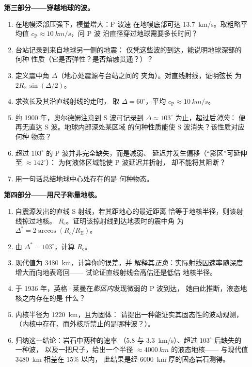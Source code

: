 \begin{problem}
\medskip\noindent\textbf{第三部分——穿越地球的波。}
\begin{enumerate}[resume]
  \item 在地幔深部压强下，模量增大：P 波速
        在地幔底部可达 \qty{13.7}{km/s}。取粗略平均值
        $c_{\text{P}} \approx \qty{10}{km/s}$，问 P 波
        沿直径穿过地球需要多长时间？
  \item 台站记录到来自地球另一侧的地震：
        仅凭这些波的到达，能说明地球深部的何种
        性质（它是否弹性？是否熔融贯通？）？
  \item 定义震中角 $\Delta$（地心处震源与台站之间的
        夹角）。对直线射线，证明弦长
        为 $2R_{\text{E}}\sin(\Delta/2)$。
  \item 求弦长及其沿直线射线的走时，
        取 $\Delta = 60^\circ$，平均 $c_{\text{P}} \approx
        \qty{10}{km/s}$。
  \item 约 1900 年，奥尔德姆注意到 S 波可记录到
        $\Delta \approx 103^\circ$ 为止，超过后\emph{消失}：
        便再无直达 S 波。地球内部深处某区域
        的何种性质能使 S 波消失？该性质对应何种
        物态？
  \item 超过 $103^\circ$ 的 P 波并非完全缺失，而是减弱、
        延迟并发生偏移（“影区”可延伸至 $\approx 142^\circ$）：
        为何液体区域能使 P 波延迟并折射，
        却不能将其阻断？
  \item 用一句话总结地球中心处存在的是
        何种物态。
\end{enumerate}

\medskip\noindent\textbf{第四部分——用尺子称量地核。}
\begin{enumerate}[resume]
  \item 自震源发出的直线 S 射线，若其距地心的最近距离
        恰等于地核半径，则该射线掠过地核。
        $R_{\text{c}}$。证明该掠射线到达地表时的震中角
        为 $\Delta^* =
        2\arccos(R_{\text{c}}/R_{\text{E}})$。
  \item 由 $\Delta^* = 103^\circ$，计算 $R_{\text{c}}$。
  \item 现代值为 \qty{3480}{km}，计算你的误差，并
        解释其\emph{正负}：实际射线因速率随深度增大而向地表弯回——
        试论证直线射线会高估还是低估
        地核半径。
  \item 于 1936 年，英格·莱曼在\emph{影区内}发现微弱的 P 波到达，
        她由此推断，液态地核之内存在的是
        什么？
  \item 内核半径为 \qty{1220}{km}，且为固体：
        请提出一种能证实其固态性的波动观测，
        （内核中存在、而外核所禁止的是哪种波？）。
  \item 归纳这一结论：岩石中两种的速率
        （$5.8$ 与 \qty{3.3}{km/s}）、超过 $103^\circ$ 后缺失的一种波，
        以及一把尺子，给出一个半径
        $\approx \qty{4000}{km}$ 的液态地核——
        与现代值 \qty{3480}{km} 相差在 $15\%$ 以内，
        此结果是经 \qty{6000}{km} 厚的固态岩石测得。
\end{enumerate}
\end{problem}
